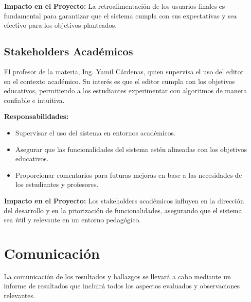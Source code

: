 \documentclass[stu, 12pt, letterpaper, donotrepeattitle, floatsintext, natbib]{apa7}
\begin{document}
\textbf{Impacto en el Proyecto:}  
La retroalimentación de los usuarios finales es fundamental para garantizar que el sistema cumpla con sus expectativas y sea efectivo para los objetivos planteados.


\subsection{Stakeholders Académicos} 
El profesor de la materia, Ing. Yamil Cárdenas, quien supervisa el uso del editor en el contexto académico. Su interés es que el editor cumpla con los objetivos educativos, permitiendo a los estudiantes experimentar con algoritmos de manera confiable e intuitiva.

\textbf{Responsabilidades:}
\begin{itemize}
    \item Supervisar el uso del sistema en entornos académicos.
    \item Asegurar que las funcionalidades del sistema estén alineadas con los objetivos educativos.
    \item Proporcionar comentarios para futuras mejoras en base a las necesidades de los estudiantes y profesores.
\end{itemize}

\textbf{Impacto en el Proyecto:}  
Los stakeholders académicos influyen en la dirección del desarrollo y en la priorización de funcionalidades, asegurando que el sistema sea útil y relevante en un entorno pedagógico.

\section{\large Comunicación}

\noindent La comunicación de los resultados y hallazgos se llevará a cabo mediante un informe de resultados que incluirá todos los aspectos evaluados y observaciones relevantes.
\end{document}

